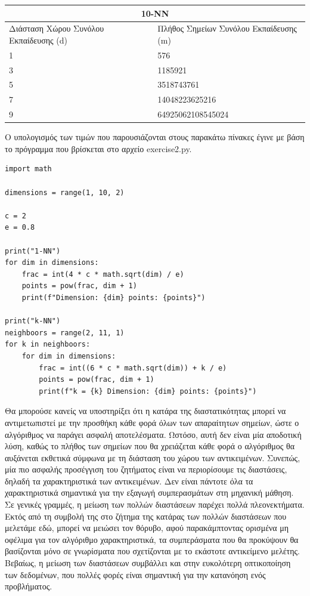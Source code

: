 \documentclass[12pt]{article}
\begin{document}
\medspace

\begin{tabular}{ |p{8cm}|p{8cm}|  }
	\hline
	\multicolumn{2}{|c|}{10-NN} \\
	\hline
	Διάσταση Χώρου Συνόλου Εκπαίδευσης (d) & Πλήθος Σημείων Συνόλου Εκπαίδευσης (m)\\
	\hline
	1   & 576    \\
	3   & 1185921    \\
	5   & 3518743761    \\
	7   & 14048223625216    \\
	9   & 64925062108545024    \\
	\hline
\end{tabular}

\medspace

Ο υπολογισμός των τιμών που παρουσιάζονται στους παρακάτω πίνακες έγινε με βάση το πρόγραμμα που βρίσκεται στο αρχείο exercise2.py.

\begin{lstlisting}
import math

dimensions = range(1, 10, 2)

c = 2
e = 0.8

print("1-NN")
for dim in dimensions:
	frac = int(4 * c * math.sqrt(dim) / e)
	points = pow(frac, dim + 1)
	print(f"Dimension: {dim} points: {points}")

print("k-NN")
neighboors = range(2, 11, 1)
for k in neighboors:
	for dim in dimensions:
		frac = int((6 * c * math.sqrt(dim)) + k / e)
		points = pow(frac, dim + 1)
		print(f"k = {k} Dimension: {dim} points: {points}")
\end{lstlisting}

Θα μπορούσε κανείς να υποστηρίξει ότι η κατάρα της διαστατικότητας μπορεί να αντιμετωπιστεί με την προσθήκη κάθε φορά όλων των απαραίτητων σημείων, ώστε ο αλγόριθμος να παράγει ασφαλή αποτελέσματα. Ωστόσο, αυτή δεν είναι μία αποδοτική λύση, καθώς το πλήθος των σημείων που θα χρειάζεται κάθε φορά ο αλγόριθμος θα αυξάνεται εκθετικά σύμφωνα με τη διάσταση του χώρου των αντικειμένων. Συνεπώς, μία πιο ασφαλής προσέγγιση του ζητήματος είναι να περιορίσουμε τις διαστάσεις, δηλαδή τα χαρακτηριστικά των αντικειμένων. Δεν είναι πάντοτε όλα τα χαρακτηριστικά σημαντικά για την εξαγωγή συμπερασμάτων στη μηχανική μάθηση. \\

Σε γενικές γραμμές, η μείωση των πολλών διαστάσεων παρέχει πολλά πλεονεκτήματα. Εκτός από τη συμβολή της στο ζήτημα της κατάρας των πολλών διαστάσεων που μελετάμε εδώ, μπορεί να μειώσει τον θόρυβο, αφού παρακάμπτοντας ορισμένα μη οφέλιμα για τον αλγόριθμο χαρακτηριστικά, τα συμπεράσματα που θα προκύψουν θα βασίζονται μόνο σε γνωρίσματα που σχετίζονται με το εκάστοτε αντικείμενο μελέτης. Βεβαίως, η μείωση των διαστάσεων συμβάλλει και στην ευκολότερη οπτικοποίηση των δεδομένων, που πολλές φορές είναι σημαντική για την κατανόηση ενός προβλήματος. \\
\end{document}

